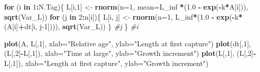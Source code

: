 \documentclass[
]{krantz}
\makeatletter
\newenvironment{Shaded}{\begin{snugshade}}{\end{snugshade}}
\newcommand{\AttributeTok}[1]{\textcolor[rgb]{0.27,0.27,0.27}{#1}}
\newcommand{\CommentTok}[1]{\textcolor[rgb]{0.37,0.37,0.37}{\textit{#1}}}
\newcommand{\ControlFlowTok}[1]{\textcolor[rgb]{0.27,0.27,0.27}{\textbf{#1}}}
\newcommand{\DecValTok}[1]{\textcolor[rgb]{0.06,0.06,0.06}{#1}}
\newcommand{\FloatTok}[1]{\textcolor[rgb]{0.06,0.06,0.06}{#1}}
\newcommand{\FunctionTok}[1]{\textcolor[rgb]{0.27,0.27,0.27}{\textbf{#1}}}
\newcommand{\NormalTok}[1]{#1}
\newcommand{\OtherTok}[1]{\textcolor[rgb]{0.37,0.37,0.37}{#1}}
\newcommand{\SpecialCharTok}[1]{\textcolor[rgb]{0.43,0.43,0.43}{\textbf{#1}}}
\newcommand{\StringTok}[1]{\textcolor[rgb]{0.5,0.5,0.5}{#1}}
\newenvironment{kframe}{%
\medskip{}
\setlength{\fboxsep}{.8em}
 \def\at@end@of@kframe{}%
 \ifinner\ifhmode%
  \def\at@end@of@kframe{\end{minipage}}%
  \begin{minipage}{\columnwidth}%
 \fi\fi%
 \def\FrameCommand##1{\hskip\@totalleftmargin \hskip-\fboxsep
 \colorbox{shadecolor}{##1}\hskip-\fboxsep
     \hskip-\linewidth \hskip-\@totalleftmargin \hskip\columnwidth}%
 \MakeFramed {\advance\hsize-\width
   \@totalleftmargin\z@ \linewidth\hsize
   \@setminipage}}%
 {\par\unskip\endMakeFramed%
 \at@end@of@kframe}
\renewenvironment{Shaded}{\begin{kframe}}{\end{kframe}}
\makeatother
\begin{document}
\begin{Shaded}
\begin{Highlighting}[]
\ControlFlowTok{for}\NormalTok{ (i }\ControlFlowTok{in} \DecValTok{1}\SpecialCharTok{:}\NormalTok{N.Tag)\{}
\NormalTok{  L[i,}\DecValTok{1}\NormalTok{] }\OtherTok{\textless{}{-}} \FunctionTok{rnorm}\NormalTok{(}\AttributeTok{n=}\DecValTok{1}\NormalTok{, }\AttributeTok{mean=}\NormalTok{L\_inf }\SpecialCharTok{*}\NormalTok{(}\FloatTok{1.0} \SpecialCharTok{{-}} \FunctionTok{exp}\NormalTok{(}\SpecialCharTok{{-}}\NormalTok{k}\SpecialCharTok{*}\NormalTok{A[i])), }\FunctionTok{sqrt}\NormalTok{(Var\_L))}
  \ControlFlowTok{for}\NormalTok{ (j }\ControlFlowTok{in} \DecValTok{2}\SpecialCharTok{:}\NormalTok{n[i])\{}
\NormalTok{    L[i, j] }\OtherTok{\textless{}{-}} \FunctionTok{rnorm}\NormalTok{(}\AttributeTok{n=}\DecValTok{1}\NormalTok{, L\_inf}\SpecialCharTok{*}\NormalTok{(}\FloatTok{1.0} \SpecialCharTok{{-}} \FunctionTok{exp}\NormalTok{(}\SpecialCharTok{{-}}\NormalTok{k}\SpecialCharTok{*}\NormalTok{(A[i]}\SpecialCharTok{+}\NormalTok{dt[i, j}\DecValTok{{-}1}\NormalTok{]))), }\FunctionTok{sqrt}\NormalTok{(Var\_L))}
\NormalTok{  \} }\CommentTok{\#j}
\NormalTok{\} }\CommentTok{\#i}

\FunctionTok{plot}\NormalTok{(A, L[,}\DecValTok{1}\NormalTok{], }\AttributeTok{xlab=}\StringTok{"Relative age"}\NormalTok{, }\AttributeTok{ylab=}\StringTok{"Length at first capture"}\NormalTok{)}
\FunctionTok{plot}\NormalTok{(dt[,}\DecValTok{1}\NormalTok{], (L[,}\DecValTok{2}\NormalTok{]}\SpecialCharTok{{-}}\NormalTok{L[,}\DecValTok{1}\NormalTok{]), }\AttributeTok{xlab=}\StringTok{"Time at large"}\NormalTok{, }\AttributeTok{ylab=}\StringTok{"Growth increment"}\NormalTok{)}
\FunctionTok{plot}\NormalTok{(L[,}\DecValTok{1}\NormalTok{], (L[,}\DecValTok{2}\NormalTok{]}\SpecialCharTok{{-}}\NormalTok{L[,}\DecValTok{1}\NormalTok{]), }\AttributeTok{xlab=}\StringTok{"Length at first capture"}\NormalTok{, }\AttributeTok{ylab=}\StringTok{"Growth increment"}\NormalTok{)}
\end{Highlighting}
\end{Shaded}
\end{document}
